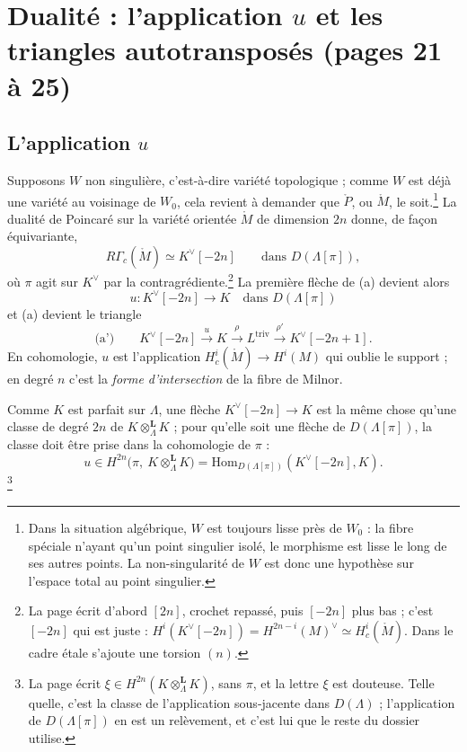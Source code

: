 \documentclass[11pt,a4paper]{article}
\begin{document}
\section*{Dualité : l'application $u$ et les triangles autotransposés (pages 21 à 25)}

\subsection*{L'application $u$}

Supposons $W$ non singulière, c'est-à-dire variété topologique ; comme $W$ est
déjà une variété au voisinage de $W_0$, cela revient à demander que
$\mathring{P}$, ou $\mathring{M}$, le soit.\footnote{Dans la situation
algébrique, $W$ est toujours lisse près de $W_0$ : la fibre spéciale n'ayant
qu'un point singulier isolé, le morphisme est lisse le long de ses autres
points. La non-singularité de $W$ est donc une hypothèse sur l'espace total au
point singulier.} La dualité de Poincaré sur la variété orientée $\mathring{M}$
de dimension $2n$ donne, de façon équivariante,
\[
  R\Gamma_{c}(\mathring{M}) \simeq K^{\vee}[-2n]
  \qquad \text{dans } D(\Lambda[\pi]),
\]
où $\pi$ agit sur $K^{\vee}$ par la contragrédiente.\footnote{La page écrit
d'abord $[2n]$, crochet repassé, puis $[-2n]$ plus bas ; c'est $[-2n]$ qui est
juste : $H^{i}(K^{\vee}[-2n]) = H^{2n-i}(M)^{\vee} \simeq
H^{i}_{c}(\mathring{M})$. Dans le cadre étale s'ajoute une torsion $(n)$.} La
première flèche de (a) devient alors
\[
  \boxed{\ u : K^{\vee}[-2n] \longrightarrow K \quad \text{dans } D(\Lambda[\pi])\ }
\]
et (a) devient le triangle
\[
  \text{(a')} \qquad K^{\vee}[-2n] \xrightarrow{\ u\ } K \xrightarrow{\ \rho\ }
  L^{\mathrm{triv}} \xrightarrow{\ \rho'\ } K^{\vee}[-2n+1] .
\]
En cohomologie, $u$ est l'application $H^{i}_{c}(\mathring{M}) \to H^{i}(M)$
qui oublie le support ; en degré $n$ c'est la \emph{forme d'intersection} de
la fibre de Milnor.

Comme $K$ est parfait sur $\Lambda$, une flèche $K^{\vee}[-2n] \to K$ est la
même chose qu'une classe de degré $2n$ de $K \otimes^{\mathbf{L}}_{\Lambda} K$ ;
pour qu'elle soit une flèche de $D(\Lambda[\pi])$, la classe doit être prise
dans la cohomologie de $\pi$ :
\[
  u \in H^{2n}\bigl(\pi,\ K \otimes^{\mathbf{L}}_{\Lambda} K\bigr) =
  \mathrm{Hom}_{D(\Lambda[\pi])}(K^{\vee}[-2n], K).
\]
\footnote{La page écrit $\xi \in H^{2n}(K \otimes^{\mathbf{L}}_{\Lambda} K)$,
sans $\pi$, et la lettre $\xi$ est douteuse. Telle quelle, c'est la classe de
l'application sous-jacente dans $D(\Lambda)$ ; l'application de $D(\Lambda[\pi])$
en est un relèvement, et c'est lui que le reste du dossier utilise.}
\end{document}
